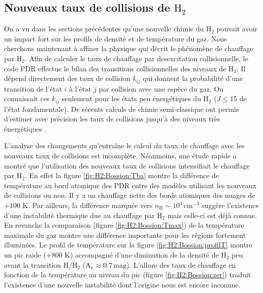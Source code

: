 \subsection{Nouveaux taux de collisions de $\mathrm{H}_2$}

On a vu dans les sections précédentes qu'une nouvelle chimie du $\mathrm{H}_2$ pouvait avoir un impact fort sur les profils de densité et de température du gaz. Nous cherchons maintenant à affiner la physique qui décrit le phénomène de chauffage par $\mathrm{H}_2$. Afin de calculer le taux de chauffage par desexcitation collisionnelle, le code PDR effectue le bilan des transitions collisionnelles des niveaux de $\mathrm{H}_2$. Il dépend directement des taux de collision $k_{ij}$ qui donnent la probabilité d'une transition de l'état $i$ à l'état $j$ par collision avec une espèce du gaz. On connaissait ces $k_{ij}$ seulement pour les états peu énergétiques du $\mathrm{H}_2$ ($J\leq15$ de l'état fondamentale). De récents calculs de chimie semi-classique ont permis d'estimer avec précision les taux de collisions jusqu'à des niveaux très énergétiques \cite{Bossion}. \newline 

L'analyse des changements qu'entraîne le calcul du taux de chauffage avec les nouveaux taux de collisions est incomplète. Néanmoins, une étude rapide a montré que l'utilisation des nouveaux taux de collisions intensifiait le chauffage par $\mathrm{H}_2$. En effet la figure \ref{fig:H2:Bossion:Tba} montre la différence de température au bord atomique des PDR entre des modèles utilisant les nouveaux de collisions ou non. Il y a un chauffage nette des bords atomiques des nuages de $+100$ K. Par ailleurs, la différence marquée vers $n_\mathrm{H} \sim 10^4\,\mathrm{cm}^{-3}$ suggère l'existence d'une instabilité thermique due au chauffage par $\mathrm{H}_2$ mais celle-ci est déjà connue. En revanche la comparaison (figure \ref{fig:H2:Bossion:Tmax}) de la température maximale du gaz montre une différence importante pour les régions fortement illuminées. Le profil de température sur la figure \ref{fig:H2:Bossion:profilT} montre un pic raide ($+800$ K) accompagné d'une diminution de la densité de $\mathrm{H}_2$ peu avant la transition $\mathrm{H}/\mathrm{H}_2$ ($\mathrm{A}_\mathrm{v} \approx 0.7 \,\mathrm{mag}$). L'allure des taux de chauffage en fonction de la température au niveau du pic (figure \ref{fig:H2:Bossion:zer}) traduit l'existence d'une nouvelle instabilité dont l'origine nous est encore inconnue. \newline 

